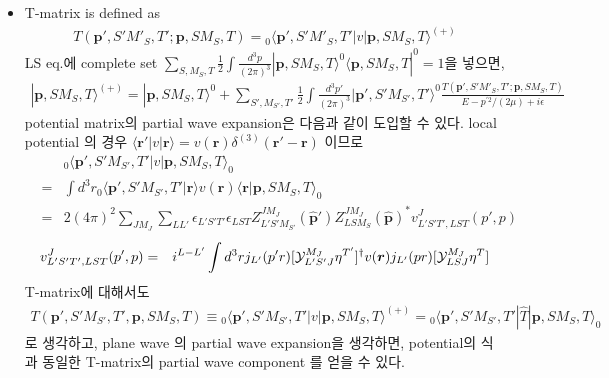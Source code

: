 \documentclass[10pt]{book}
\def\bm{\boldsymbol}
\newcommand{\bea}{\begin{eqnarray}}
\newcommand{\eea}{\end{eqnarray}}
\newcommand{\no}{\nonumber \\}
\def\vp{{\bm p}}
\def\vr{{\bm r}}
\def\la{\langle}
\def\ra{\rangle}
\begin{document}
\begin{itemize}
\item
T-matrix is defined as
\bea
T(\vp',S' M'_S,T';\vp,S M_S,T)
={}_0\la \vp', S' M'_S,T'|v|\vp,S M_S,T\ra^{(+)}
\eea
LS eq.에 complete set 
$\sum_{S,M_S,T}\frac{1}{2}\int \frac{d^3 p}{(2\pi)^3} |\vp,S M_S,T\ra^0\la \vp,S M_S,T|^0=1$을 넣으면,
\bea
|\vp,S M_S,T\ra^{(+)}=|\vp,S M_S,T\ra^{0}
+\sum_{S',M_{S'},T'}\frac{1}{2}
\int \frac{d^3 p'}{(2\pi)^3} |\vp',S' M_{S'},T'\ra^0
\frac{T(\vp',S' M'_S,T';\vp,S M_S,T)}{E-p^{'2}/(2\mu)+ i\epsilon} 
\eea
potential matrix의 partial wave expansion은 다음과 같이 도입할 수 있다.
local potential 의 경우 $\la \vr'|v|\vr\ra=v(\vr)\delta^{(3)}(\vr'-\vr)$
이므로
\bea
& &{}_0\la \vp',S' M_{S'},T'|v|\vp,S M_S,T\ra_0\no
&=&\int d^3 r {}_0\la \vp',S' M_{S'},T'|\vr\ra v(\vr)
 \la \vr|\vp,S M_S,T\ra_0 
\no
&=&2(4\pi)^2\sum_{J M_J}\sum_{L L'}\epsilon_{L'S'T'}\epsilon_{LST}
Z^{J M_J}_{L'S'M_{S'}}(\hat{\vp}')Z^{J M_J}_{LSM_{S}}(\hat{\vp})^*
v^{J}_{L'S'T',LST}(p',p) 
\eea
\bea
v^{J}_{L'S'T',LST}(p',p)&=&
i^{L-L'}\int d^3 r j_{L'}(p'r)[{\cal Y}^{M_J}_{L'S'J}\eta^{T'}]^\dagger
v(\vr)j_{L'}(pr)[{\cal Y}^{M_J}_{LSJ}\eta^{T}]
\eea
T-matrix에 대해서도 
\bea
T(\vp',S' M_{S'},T',\vp,S M_S,T)
\equiv {}_0\la \vp',S' M_{S'},T'| v|\vp,S M_S,T\ra^{(+)}
={}_0\la \vp',S' M_{S'},T'| \hat{T} |\vp,S M_S,T\ra_0
\eea
로 생각하고, plane wave 의 partial wave expansion을 생각하면,
potential의 식과 동일한 T-matrix의 partial wave component 를
얻을 수 있다. 


\end{itemize}
\end{document}
